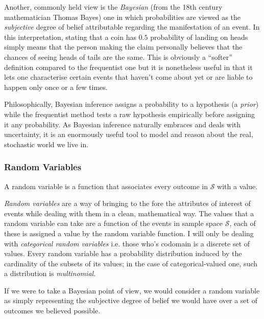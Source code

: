 Another, commonly held view is the \textit{Bayesian} (from the 18th century mathematician Thomas Bayes) one in which probabilities are viewed as the \textit{subjective} degree of belief attributable regarding the manifestation of an event.
In this interpretation, stating that a coin has $0.5$ probability of landing on heads simply means that the person making the claim personally believes that the chances of seeing heads of tails are the same.
This is obviously a ``softer'' definition compared to the frequentist one but it is nonetheless useful in that it lets one characterise certain events that haven't come about yet or are liable to happen only once or a few times.

Philosophically, Bayesian inference assigns a probability to a hypothesis (a \textit{prior}) while the frequentist method tests a raw hypothesis empirically before assigning it any probability.
As Bayesian inference naturally embraces and deals with uncertainty, it is an enormously useful tool to model and reason about the real, stochastic world we live in.

\subsubsection{Random Variables}
\begin{definition}
	A random variable is a function that associates every outcome in $\mathcal{S}$ with a value.
\end{definition}
\textit{Random variables} are a way of bringing to the fore the attributes of interest of events while dealing with them in a clean, mathematical way.
The values that a random variable can take are a function of the events in sample space $\mathcal{S}$, each of these is assigned a value by the random variable function.
I will only be dealing with \textit{categorical random variables} i.e. those who's codomain is a discrete set of values.
Every random variable has a probability distribution induced by the cardinality of the subsets of its values; in the case of categorical-valued one, such a distribution is \textit{multinomial}.

If we were to take a Bayesian point of view, we would consider a random variable as simply representing the subjective degree of belief we would have over a set of outcomes we believed possible.

